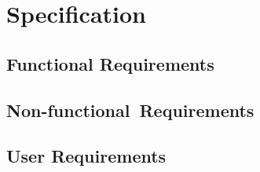 
\section{Specification}


    \subsection{Functional Requirements}

    \subsection{\mbox{Non-functional Requirements}}

    \subsection{User Requirements}
        
